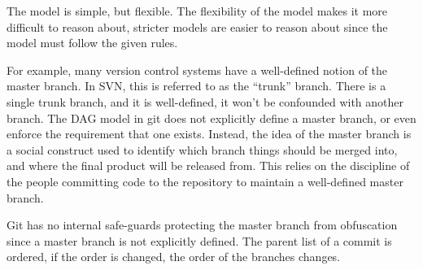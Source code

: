 The model is simple, but flexible.
The flexibility of the model makes it more difficult to reason about,
stricter models are easier to reason about since the model must follow
the given rules.

For example, many version control systems have a well-defined notion of
the master branch.
In SVN, this is referred to as the ``trunk'' branch.
There is a single trunk branch, and it is well-defined, it won't be
confounded with another branch.
The DAG model in git does not explicitly define a master branch, or even
enforce the requirement that one exists.
Instead, the idea of the master branch is a social construct used to
identify which branch things should be merged into, and where the final
product will be released from.
This relies on the discipline of the people committing code to the
repository to maintain a well-defined master branch.

Git has no internal safe-guards protecting the master branch from
obfuscation since a master branch is not explicitly defined.
The parent list of a commit is ordered, if the order is changed, the
order of the branches changes.

